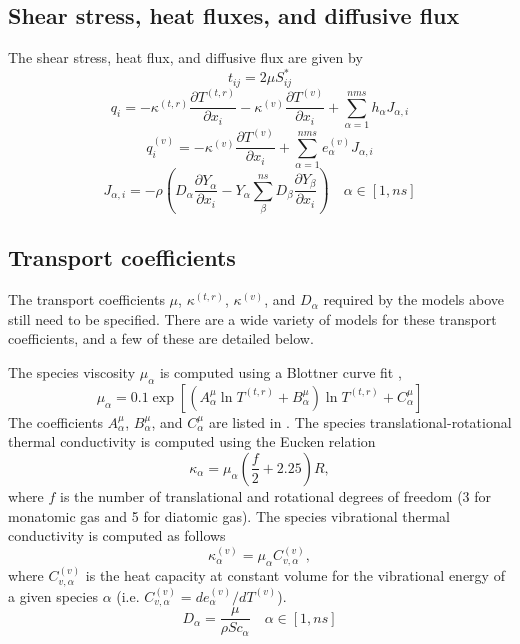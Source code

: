 \documentclass[oneside,a4paper,11pt]{report}
\begin{document}
\subsection{Shear stress, heat fluxes, and diffusive flux}
The shear stress, heat flux, and diffusive flux are given by
\begin{equation}
t_{ij} = 2\mu S_{ij}^*
\end{equation}
\begin{equation}
q_i = -\kappa^{(t,r)} \frac{\partial T^{(t,r)}}{\partial x_i} - \kappa^{(v)} \frac{\partial T^{(v)}}{\partial x_i}  + \sum_{\alpha=1}^{nms} h_\alpha J_{\alpha,i}
\end{equation}
\begin{equation}
q_i^{(v)} = -\kappa^{(v)} \frac{\partial T^{(v)}}{\partial x_i} + \sum_{\alpha = 1}^{nms} e_\alpha^{(v)} J_{\alpha,i}
\end{equation}
\begin{equation}
J_{\alpha,i} = -\rho \left ( D_\alpha \frac{\partial Y_\alpha}{\partial x_i} - Y_\alpha \sum_\beta^{ns} D_\beta \frac{\partial Y_\beta}{\partial x_i} \right ) \quad \alpha \in [1,ns]
\end{equation}

\subsection{Transport coefficients}
The transport coefficients $\mu$, $\kappa^{(t,r)}$, $\kappa^{(v)}$, and $D_\alpha$ required by the models above still need to be specified. There are a wide variety of models for these transport coefficients, and a few of these are detailed below. 

The species viscosity $\mu_\alpha$ is computed using a Blottner curve fit \cite{blottner1971},
\begin{equation}
    \mu_\alpha = 0.1 \exp \left [ \left ( A_\alpha^\mu \ln T^{(t,r)} + B_\alpha^\mu \right ) \ln T^{(t,r)} + C_\alpha^\mu \right ]
\end{equation}
The coefficients $A_\alpha^\mu$, $B_\alpha^\mu$, and $C_\alpha^\mu$ are listed in \cite{blottner1971}. The species translational-rotational thermal conductivity is computed using the Eucken relation
\begin{equation}
\kappa_\alpha = \mu_\alpha \left ( \frac{f}{2} + 2.25 \right ) R,
\end{equation}
where $f$ is the number of translational and rotational degrees of freedom (3 for monatomic gas and 5 for diatomic gas). The species vibrational thermal conductivity is computed as follows
\begin{equation}
    \kappa_\alpha^{(v)} = \mu_\alpha C_{v,\alpha}^{(v)},
\end{equation}
where $C_{v,\alpha}^{(v)}$ is the heat capacity at constant volume for the vibrational energy of a given species $\alpha$ (i.e. $C_{v,\alpha}^{(v)} = d e_\alpha^{(v)} / d T^{(v)}$).
\begin{equation}
D_\alpha = \frac{\mu}{\rho Sc_\alpha} \quad \alpha \in [1,ns]
\end{equation}
\end{document}
